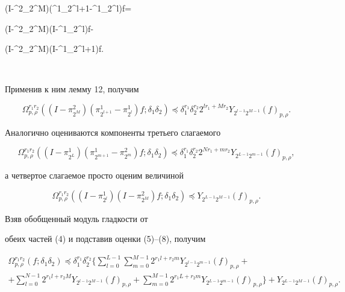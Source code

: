 (I-\pi^2_{2^M})(\pi^1_{2^{l+1}}-\pi^1_{2^l})f= 


(I-\pi^2_{2^M})(I-\pi^1_{2^l})f- 


(I-\pi^2_{2^M})(I-\pi^1_{2^{l+1}})f. 


$$ 


Применив к ним лемму 12, получим 


\begin{equation} 


\Omega^{r_1r_2}_{p,\rho}((I-\pi^2_{2^M})(\pi^1_{2^{l+1}}- 


\pi^1_{2^l})f;\delta_1\delta_2)\preceq 


\delta^{r_1}_1\delta^{r_2}_2 2^{l r_1+M r_2} 


Y_{2^{l-1}2^{M-1}}(f)_{p,\rho}. 


\end{equation} 


Аналогично оцениваются компоненты третьего слагаемого 


\begin{equation} 


\Omega^{r_1r_2}_{p,\rho}((I-\pi^1_{2^L}) 


(\pi^1_{2^{m+1}}-\pi^2_{2^m})f;\delta_1\delta_2)\preceq 


\delta^{r_1}_1\delta^{r_2}_2 2^{N r_1+m r_2} 


Y_{2^{L-1}2^{m-1}}(f)_{p,\rho},


\end{equation} 


а четвертое слагаемое просто оценим величиной 


\begin{equation} 


\Omega^{r_1r_2}_{p,\rho}((I-\pi^1_{2^l}) 


(I-\pi^2_{2^M})f;\delta_1\delta_2)\preceq 


Y_{2^{L-1}2^{M-1}}(f)_{p,\rho}. 


\end{equation} 


Взяв обобщенный модуль гладкости от 


обеих частей (4) и подставив оценки (5)--(8), получим 


\begin{multline} 


\Omega^{r_1r_2}_{p,\rho}(f;\delta_1\delta_2)\preceq 


\delta^{r_1}_1\delta^{r_2}_2\bigg\{\sum^{L-1}_{l=0} 


\sum^{M-1}_{m=0}2^{r_1l+r_2m}Y_{2^{l-1}2^{m-1}}(f)_{p,\rho}+\\ 


% 


+\sum^{N-1}_{l=0}2^{r_1l+r_2M}Y_{2^{l-1}2^{M-1}}(f)_{p,\rho}+ 


\sum^{M-1}_{m=0}2^{r_1L+r_2m}Y_{2^{L-1}2^{m-1}} 


(f)_{p,\rho}\bigg\}+Y_{2^{L-1}2^{M-1}}(f)_{p,\rho}. 


\end{multline} 


